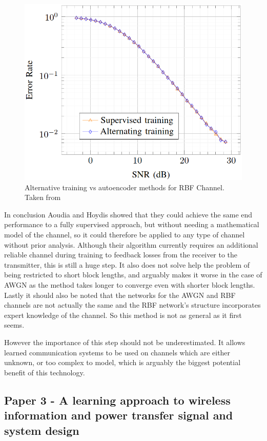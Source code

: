 \documentclass[12pt,onecolumn,letterpaper]{article}
\newcommand\genfigsize{0.5}
\begin{document}
\begin{figure}[t]
   \centering
   \includegraphics[width=\genfigsize\linewidth]{figures/Aoudia_RBF_performance.PNG}
   \caption{Alternative training vs autoencoder methods for RBF Channel. Taken from~\cite{Aoudia}}
\label{fig:AoudiaPerformanceRbf}
\end{figure}

In conclusion Aoudia and Hoydis showed that they could achieve the same end performance to a fully supervised approach, but without needing a mathematical model of the channel, so it could therefore be applied to any type of channel without prior analysis. 
Although their algorithm currently requires an additional reliable channel during training to feedback losses from the receiver to the transmitter, this is still a huge step. It also does not solve help the problem of being restricted to short block lengths, and arguably makes it worse in the case of AWGN as the method takes longer to converge even with shorter block lengths. Lastly it should also be noted that the networks for the AWGN and RBF channels are not actually the same and the RBF network's structure incorporates expert knowledge of the channel. So this method is not as general as it first seems.

However the importance of this step should not be underestimated. It allows learned communication systems to be used on channels which are either unknown, or too complex to model, which is arguably the biggest potential benefit of this technology. 

\FloatBarrier
\subsection{Paper 3 - A learning approach to wireless information and power transfer signal and system design}
\end{document}
